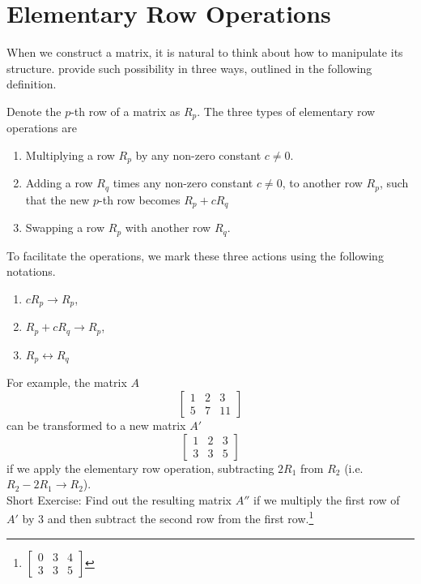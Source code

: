 \section{Elementary Row Operations}
When we construct a matrix, it is natural to think about how to manipulate its structure.  provide such possibility in three ways, outlined in the following definition.
\begin{defn}
\label{defn:elerowop}
Denote the $p$-th row of a matrix as $R_{p}$. The three types of elementary row operations are
\begin{enumerate}
\item Multiplying a row $R_{p}$ by any non-zero constant $c \neq 0$.
\item Adding a row $R_{q}$ times any non-zero constant $c \neq 0$, to another row $R_{p}$, such that the new $p$-th row becomes $R_{p} + cR_{q}$
\item Swapping a row $R_{p}$ with another row $R_{q}$.
\end{enumerate}
To facilitate the operations, we mark these three actions using the following notations.
\begin{enumerate}
\item $cR_{p} \rightarrow R_{p}$,
\item $R_{p} + cR_{q} \rightarrow R_{p}$,
\item $R_{p} \leftrightarrow R_{q}$
\end{enumerate}
\end{defn}
For example, the matrix $A$
\begin{equation*}
\begin{bmatrix}
1 & 2 & 3 \\
5 & 7 & 11
\end{bmatrix}
\end{equation*}
can be transformed to a new matrix $A'$
\begin{equation*}
\begin{bmatrix}
1 & 2 & 3 \\
3 & 3 & 5
\end{bmatrix}
\end{equation*}
if we apply the elementary row operation, subtracting $2R_1$ from $R_2$  (i.e.\ $R_2 - 2R_1 \to R_2$). \\Short Exercise: Find out the resulting matrix $A''$ if we multiply the first row of $A'$ by $3$ and then subtract the second row from the first row.\footnote{
$\begin{bmatrix}
0 & 3 & 4 \\
3 & 3 & 5
\end{bmatrix}$}\\

